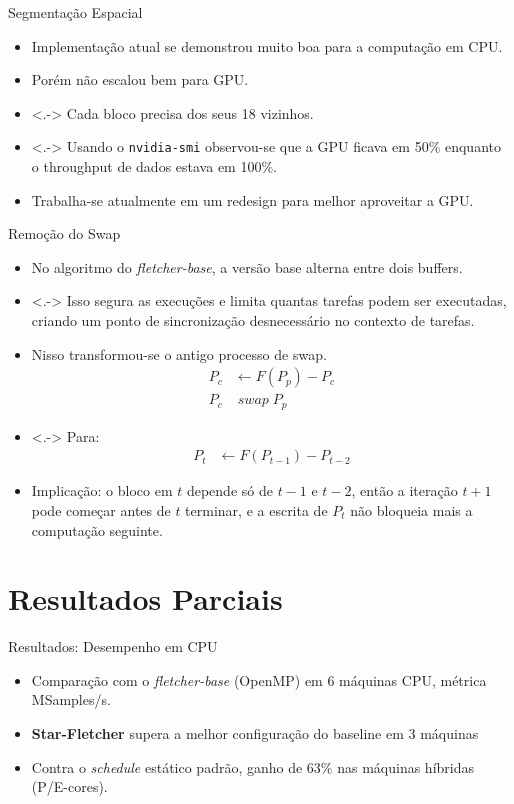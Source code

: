 \documentclass{beamer}
\newcommand{\starflet}{\textbf{Star-Fletcher}}
\begin{document}
\begin{frame}{Segmentação Espacial}
  \begin{itemize}
    \item<+-> Implementação atual se demonstrou muito boa para a computação em CPU.
    \item<+-> Porém não escalou bem para GPU.
    \item<.-> Cada bloco precisa dos seus 18 vizinhos.
    \item<.-> Usando o \texttt{nvidia-smi} observou-se que a GPU ficava em 50\% enquanto o throughput de dados estava em 100\%.
    \item<+-> Trabalha-se atualmente em um redesign para melhor aproveitar a GPU.
  \end{itemize}
\end{frame}

\begin{frame}{Remoção do Swap}
  \begin{itemize}
  \item<+-> No algoritmo do \textit{fletcher-base}, a versão base alterna entre dois buffers.
  \item<.-> Isso segura as execuções e limita quantas tarefas podem ser executadas, criando um ponto de sincronização desnecessário no contexto de tarefas.
  \item<+-> Nisso transformou-se o antigo processo de swap.
    \begin{align*}
       P_c &\leftarrow F(P_p) - P_c \\
       P_c &\;swap\; P_p
    \end{align*}
  \item<.-> Para:
    \begin{align*}
      P_t  &\leftarrow F(P_{t-1}) - P_{t-2}
    \end{align*}
  \item<+-> Implicação: o bloco em $t$ depende só de $t-1$ e $t-2$, então a iteração $t+1$ pode começar antes de $t$ terminar, e a escrita de $P_t$ não bloqueia mais a computação seguinte.
  \end{itemize}
\end{frame}

\section{Resultados Parciais}



\begin{frame}{Resultados: Desempenho em CPU}
  \begin{itemize}
  \item Comparação com o \textit{fletcher-base} (OpenMP) em 6 máquinas CPU, métrica MSamples/s.
  \item \starflet{} supera a melhor configuração do baseline em 3 máquinas
  \item Contra o \textit{schedule} estático padrão, ganho de 63\% nas máquinas híbridas (P/E-cores).
  \end{itemize}
\end{frame}
\end{document}

